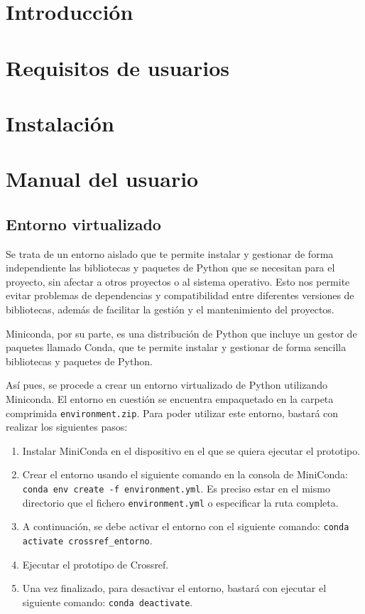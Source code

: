 
\section{Introducción}

\section{Requisitos de usuarios}

\section{Instalación}

\section{Manual del usuario}


\subsection{Entorno virtualizado}

Se trata de un entorno aislado que te permite instalar y gestionar de forma independiente las bibliotecas y paquetes de Python que se necesitan para el proyecto, sin afectar a otros proyectos o al sistema operativo. Esto nos permite evitar  problemas de dependencias y compatibilidad entre diferentes versiones de bibliotecas, además de facilitar la gestión y el mantenimiento del proyectos.
 
Miniconda, por su parte, es una distribución de Python que incluye un gestor de paquetes llamado Conda, que te permite instalar y gestionar de forma sencilla bibliotecas y paquetes de Python.

Así pues, se procede a crear un entorno virtualizado de Python utilizando Miniconda. El entorno en cuestión se encuentra empaquetado
en la carpeta comprimida \texttt{environment.zip}. Para poder utilizar este entorno, bastará con realizar los siguientes pasos:

\begin{enumerate}
    \item Instalar MiniConda en el dispositivo en el que se quiera ejecutar el prototipo.
    \item Crear el entorno usando el siguiente comando en la consola de MiniConda: \verb|conda env create -f environment.yml|. Es preciso estar en el mismo directorio que el fichero \texttt{environment.yml} o especificar la ruta completa.
    \item A continuación, se debe activar el entorno con el siguiente comando: \verb|conda activate crossref_entorno|. 
    \item Ejecutar el prototipo de Crossref.
    \item Una vez finalizado, para desactivar el entorno, bastará con ejecutar el siguiente comando: \verb|conda deactivate|. 
\end{enumerate}


